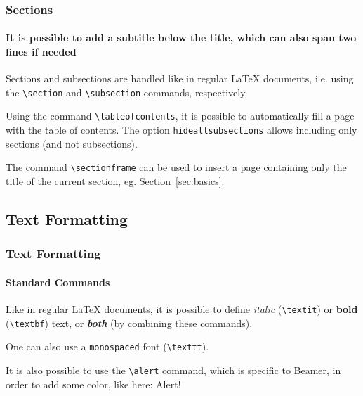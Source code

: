 \documentclass[10pt,    %
    english,            %
    xcolor=table,       %
    envcountsect,       %
    aspectratio=43      %
]{beamer}
\begin{document}
\begin{frame}
    \frametitle{Sections} 
    \framesubtitle{It is possible to add a subtitle below the title, which can also span two lines if needed}
    
    Sections and subsections are handled like in regular \LaTeX{} documents, i.e. using the \texttt{\textbackslash{}section} and \texttt{\textbackslash{}subsection} commands, respectively.
    
    \vspace{0.25cm}
    Using the command \texttt{\textbackslash{}tableofcontents}, it is possible to automatically fill a page with the table of contents. The option \texttt{hideallsubsections} allows including only sections (and not subsections).
    
    \vspace{0.25cm}
    The command \texttt{\textbackslash{}sectionframe} can be used to insert a page containing only the title of the current section, eg. Section~\ref{sec:basics}.
\end{frame}




\subsection{Text Formatting}
\begin{frame}
    \frametitle{Text Formatting} 
    \framesubtitle{Standard Commands} 
    
    Like in regular \LaTeX{} documents, it is possible to define \textit{italic} (\texttt{\textbackslash{}textit}) or \textbf{bold} (\texttt{\textbackslash{}textbf}) text, or \textit{\textbf{both}} (by combining these commands). 
    
    \vspace{0.25cm}
    One can also use a \texttt{monospaced} font (\texttt{\textbackslash{}texttt}).
    
    \vspace{0.25cm}
    It is also possible to use the \texttt{\textbackslash{}alert} command, which is specific to Beamer, in order to add some color, like here: \alert{Alert!}
    
\end{frame}
    
\end{document}
